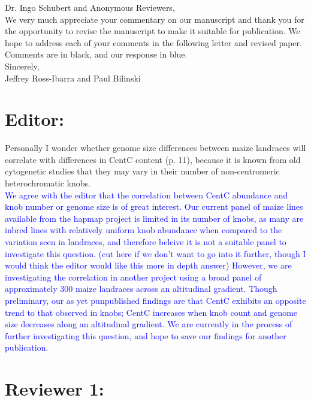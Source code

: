 \documentclass[]{article}
\newcommand{\res}[1]{\noindent \textcolor{blue}{{#1}} \\}
\begin{document}
\noindent Dr. Ingo Schubert and Anonymous Reviewers, \\

We very much appreciate your commentary on our manuscript and thank you for the opportunity to revise the manuscript to make it suitable for publication.  
We hope to address each of your comments in the following letter and revised paper. Comments are in black, and our response in blue.\\

\noindent Sincerely,\\

\noindent Jeffrey Ross-Ibarra and Paul Bilinski

\section*{Editor:}

Personally I wonder whether genome size differences between maize landraces will correlate with differences in CentC content (p. 11), because it is known from old cytogenetic studies that they may vary in their number of non-centromeric heterochromatic knobs. \\

\res{We agree with the editor that the correlation between CentC abundance and knob number or genome size is of great interest. 
 Our current panel of maize lines available from the hapmap project is limited in its number of knobs, as many are inbred lines with relatively uniform knob abundance when compared to the variation seen in landraces, and therefore beleive it is not a suitable panel to investigate this question.
(cut here if we don't want to go into it further, though I would think the editor would like this more in depth answer)
However, we are investigating the correlation in another project using a broad panel of approximately 300 maize landraces across an altitudinal gradient.  
Though preliminary, our as yet punpublished findings are that CentC exhibits an opposite trend to that observed in knobs; CentC increases when knob count and genome size decreases along an altitudinal gradient.  
We are currently in the process of further investigating this question, and hope to save our findings for another publication.}

\section*{Reviewer 1:}
\end{document}
